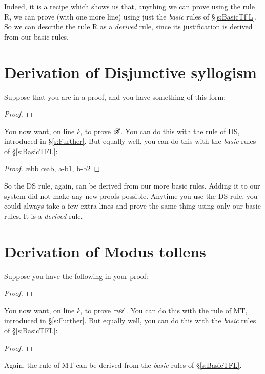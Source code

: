 Indeed, it is a recipe which shows us that, anything we can prove using the rule R, we can prove (with one more line) using just the \emph{basic} rules of \S\ref{s:BasicTFL}. So we can describe the rule R as a \emph{derived} rule, since its justification is derived from our basic rules.


\section{Derivation of Disjunctive syllogism}
Suppose that you are in a proof, and you have something of this form:
\begin{proof}
\end{proof}
You now want, on line $k$, to prove $\mathscr{B}$. You can do this with the rule of DS, introduced in \S\ref{s:Further}. But equally well, you can do this with the \emph{basic} rules of \S\ref{s:BasicTFL}:
	\begin{proof}
		\open
		\close
		\open
			\ae{bb}
		\close
	\oe{ab, a-b1, b-b2}
\end{proof}
So the DS rule, again, can be derived from our more basic rules. Adding it to our system did not make any new proofs possible. Anytime you use the DS rule, you could always take a few extra lines and prove the same thing using only our basic rules. It is a \emph{derived} rule.

\section{Derivation of Modus tollens}
Suppose you have the following in your proof:
\begin{proof}
\end{proof}
You now want, on line $k$, to prove $\neg \mathscr{A}$. You can do this with the rule of MT, introduced in \S\ref{s:Further}. But equally well, you can do this with the \emph{basic} rules of \S\ref{s:BasicTFL}:
\begin{proof}
		\open
		\close
\end{proof}
Again, the rule of MT can be derived from the \emph{basic} rules of \S\ref{s:BasicTFL}.

